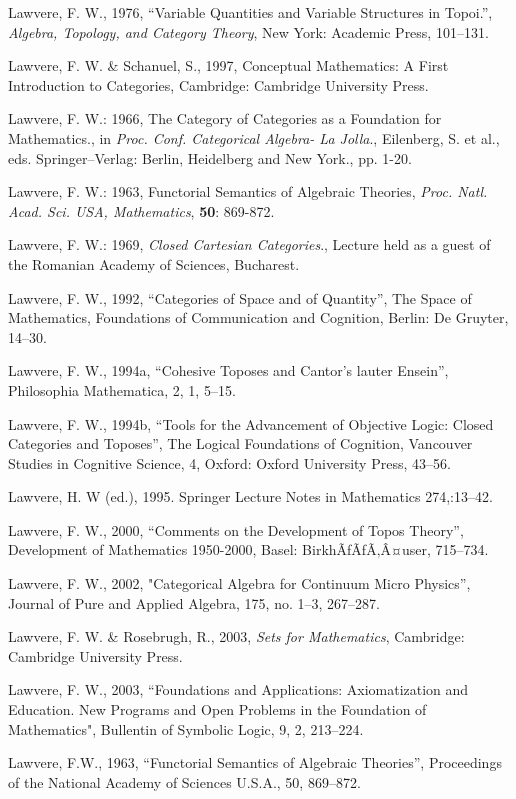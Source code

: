 \documentclass[12pt]{article}
\theoremstyle{plain}
\theoremstyle{definition}
\numberwithin{equation}{section}
\begin{document}
\begin{thebibliography}{99}
Lawvere, F. W., 1976, ``Variable Quantities and Variable Structures in Topoi.'', {\em Algebra, Topology, and Category Theory}, New York: Academic Press, 101--131. 

Lawvere, F. W. \& Schanuel, S., 1997, Conceptual Mathematics: A First Introduction to Categories, Cambridge: Cambridge University Press. 

Lawvere, F. W.: 1966, The Category of Categories as a Foundation for Mathematics., in
\emph{Proc. Conf. Categorical Algebra- La Jolla}., Eilenberg, S. et al., eds. Springer--Verlag:
Berlin, Heidelberg and New York., pp. 1-20.

Lawvere, F. W.: 1963, Functorial Semantics of Algebraic Theories,
\emph{Proc. Natl. Acad. Sci. USA, Mathematics}, \textbf{50}: 869-872.

Lawvere, F. W.: 1969, \emph{Closed Cartesian Categories}., Lecture held as a guest of the
Romanian Academy of Sciences, Bucharest.

Lawvere, F. W., 1992, ``Categories of Space and of Quantity'', The Space of Mathematics, Foundations of Communication and Cognition, Berlin: De Gruyter, 14--30.  

Lawvere, F. W., 1994a, ``Cohesive Toposes and Cantor's lauter Ensein'', Philosophia Mathematica, 2, 1, 5--15. 

Lawvere, F. W., 1994b, ``Tools for the Advancement of Objective Logic: Closed Categories and Toposes'', The Logical Foundations of Cognition, Vancouver Studies in Cognitive Science, 4, Oxford: Oxford University Press, 43--56.  

Lawvere, H. W (ed.), 1995. Springer Lecture Notes in Mathematics 274,:13--42. 

Lawvere, F. W., 2000, ``Comments on the Development of Topos Theory'', Development of Mathematics 1950-2000, Basel: BirkhÃƒÃƒÃ‚Â¤user, 715--734. 

Lawvere, F. W., 2002, "Categorical Algebra for Continuum Micro Physics'', Journal of Pure and Applied Algebra, 175, no. 1--3, 267--287. 

Lawvere, F. W. \& Rosebrugh, R., 2003, \emph{Sets for Mathematics}, Cambridge: Cambridge University Press.  

Lawvere, F. W., 2003, ``Foundations and Applications: Axiomatization and Education. New Programs and Open Problems in the Foundation of Mathematics", Bullentin of Symbolic Logic, 9, 2, 213--224. 

Lawvere, F.W., 1963, ``Functorial Semantics of Algebraic Theories'', Proceedings of the National Academy of Sciences U.S.A., 50, 869--872. 

\end{thebibliography}
\end{document}
